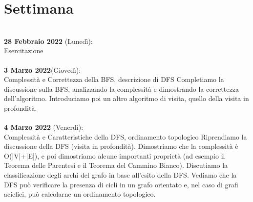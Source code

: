 \documentclass{article}
\begin{document}
\section{Settimana}
\\\textbf{28 Febbraio 2022} (Lunedì): \\Esercitazione\\
\\\textbf{3 Marzo 2022}(Giovedì): \\Complessità e Correttezza della BFS, descrizione di DFS
Completiamo la discussione sulla BFS, analizzando la complessità e dimostrando la correttezza dell'algoritmo. Introduciamo poi un altro algoritmo di visita, quello della visita in profondità.\\
\\\textbf{4 Marzo 2022} (Venerdì): \\Complessità e Caratteristiche della DFS, ordinamento topologico
Riprendiamo la discussione della DFS (visita in profondità). Dimostriamo che la complessità è O(|V|+|E|), e poi dimostriamo alcune importanti proprietà (ad esempio il Teorema delle Parentesi e il Teorema del Cammino Bianco). Discutiamo la classificazione degli archi del grafo in base all'esito della DFS. Vediamo che la DFS può verificare la presenza di cicli in un grafo orientato e, nel caso di grafi aciclici, può calcolarne un ordinamento topologico.
\end{document}
